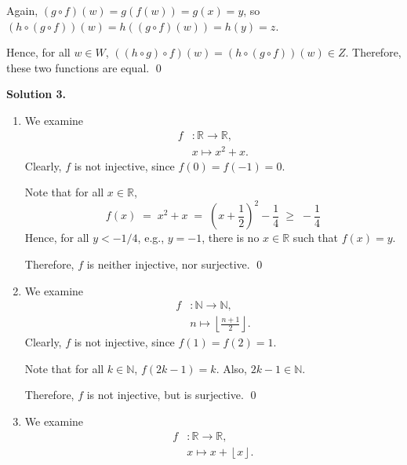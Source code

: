 \documentclass[10pt]{article}
\begin{document}
        Again, $(g\circ f)(w) = g(f(w)) = g(x) = y$, so $(h \circ (g\circ f))(w) = h((g\circ f)(w)) = h(y) = z$.

        Hence, for all $w \in W$, $((h\circ g)\circ f)(w) = (h\circ (g\circ f))(w) \in Z$.
        Therefore, these two functions are equal. \qed

        \textbf{Solution 3.}\\
        \begin{enumerate}
                \item We examine
                \begin{align*}
                        f&: \mathbb{R} \to \mathbb{R},\\
                        &x \mapsto x^2 + x.
                \end{align*}
                Clearly, $f$ is not injective, since $f(0) = f(-1) = 0$.
                
                Note that for all $x \in \mathbb{R}$,
                \[
                        f(x) \;=\; x^2 + x 
                                \;=\; \left(x + \frac{1}{2}\right)^2 - \frac{1}{4}
                                \;\geq\; -\frac{1}{4}
                \]
                Hence, for all $y < -1 /4$, e.g., $y = -1$, there is no $x \in \mathbb{R}$ such that $f(x) = y$.
                
                Therefore, $f$ is neither injective, nor surjective. \qed
                
                \item We examine
                \begin{align*}
                        f&: \mathbb{N} \to \mathbb{N},\\
                        &n \mapsto \left\lfloor \frac{n+1}{2}  \right\rfloor .
                \end{align*}
                Clearly, $f$ is not injective, since $f(1) = f(2) = 1$.

                Note that for all $k \in \mathbb{N}$, $f(2k - 1) = k$. Also, $2k-1 \in \mathbb{N}$.

                Therefore, $f$ is not injective, but is surjective. \qed
                
                \item We examine
                \begin{align*}
                        f&: \mathbb{R} \to \mathbb{R},\\
                        &x \mapsto x + \left\lfloor x \right\rfloor .
                \end{align*}


\end{enumerate}
\end{document}
